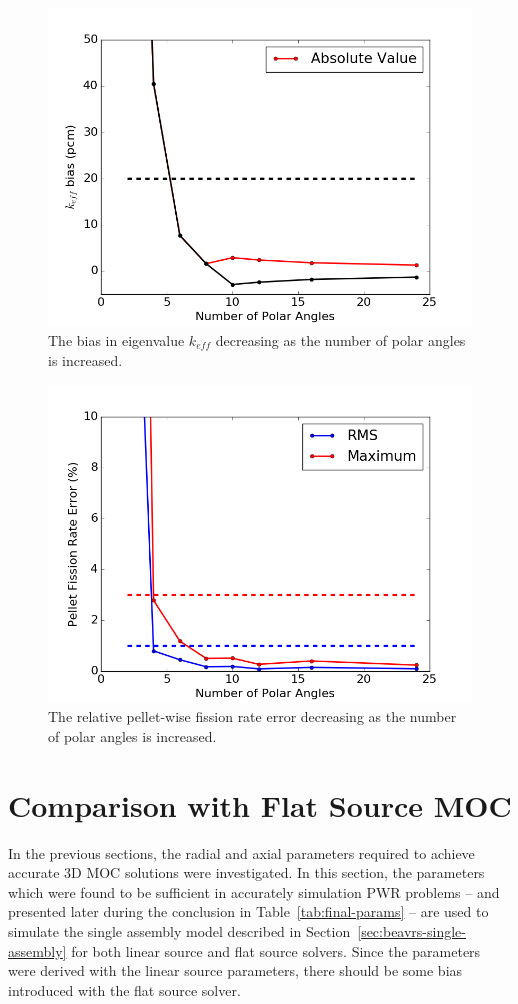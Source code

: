 \begin{figure}[h!]
	\centering
	\includegraphics[width=0.7\linewidth]{figures/results/sensitivity/rodded_polar_angles_pcm.png}
	\caption[]{The bias in eigenvalue $k_{\textit{eff}}$ decreasing as the number of polar angles is increased.}
	\label{fig:rodded-polar-angles-pcm}
\end{figure}
\begin{figure}[h!]
	\centering
	\includegraphics[width=0.7\linewidth]{figures/results/sensitivity/rodded_polar_angles_fr.png}
	\caption[]{The relative pellet-wise fission rate error decreasing as the number of polar angles is increased.}
	\label{fig:rodded-polar-angles-fr}
\end{figure}

\newpage
\section{Comparison with Flat Source MOC}
\label{sec:flat-linear-comparison}

In the previous sections, the radial and axial parameters required to achieve accurate 3D \ac{MOC} solutions were investigated. In this section, the parameters which were found to be sufficient in accurately simulation \ac{PWR} problems -- and presented later during the conclusion in Table~\ref{tab:final-params} -- are used to simulate the single assembly model described in Section~\ref{sec:beavrs-single-assembly} for both linear source and flat source solvers. Since the parameters were derived with the linear source parameters, there should be some bias introduced with the flat source solver.

